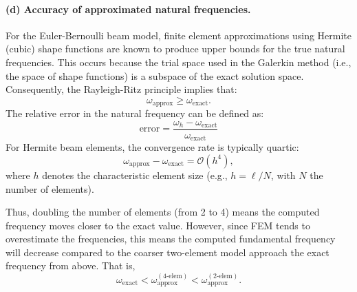 \documentclass[12pt]{article}
\begin{document}
\paragraph*{(d) Accuracy of approximated natural frequencies.} For the Euler-Bernoulli beam model, finite element approximations using Hermite (cubic) shape functions are known to produce upper bounds for the true natural frequencies. This occurs because the trial space used in the Galerkin method (i.e., the space of shape functions) is a subspace of the exact solution space. Consequently, the Rayleigh-Ritz principle implies that:
\[
	\omega_{\text{approx}} \geq \omega_{\text{exact}}.
\]
The relative error in the natural frequency can be defined as:
\[
	\text{error} = \frac{\omega_h - \omega_{\text{exact}}}{\omega_{\text{exact}}}
\]
For Hermite beam elements, the convergence rate is typically quartic:
\[
	\omega_{\text{approx}} - \omega_{\text{exact}} = \mathcal{O}(h^4),
\]
where \( h \) denotes the characteristic element size (e.g., \( h = \ell / N \), with \( N \) the number of elements).

Thus, doubling the number of elements (from 2 to 4) means the computed frequency moves closer to the exact value. However, since FEM tends to overestimate the frequencies, this means the computed fundamental frequency will decrease compared to the coarser two-element model approach the exact frequency from above. That is,
\[
	\omega_{\text{exact}}<\omega_{\text{approx}}^{(4\text{-elem})} < \omega_{\text{approx}}^{(2\text{-elem})}.
\]
\end{document}
